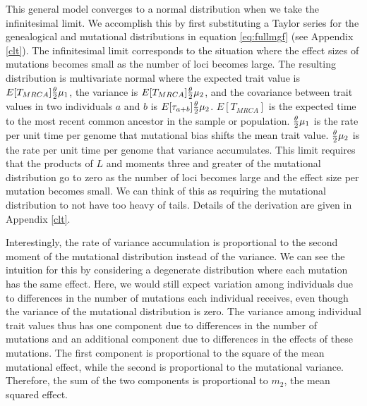 This general model converges to a normal distribution when we take the
infinitesimal limit. We accomplish this by first substituting a Taylor series
for the genealogical and mutational distributions in equation \eqref{eq:fullmgf}
(see Appendix \ref{clt}). The infinitesimal limit corresponds to the situation
where the effect sizes of mutations becomes small as the number of loci becomes
large. The resulting distribution is multivariate normal where the expected
trait value is $E[T_{MRCA}] \frac{\theta}{2} \mu_1$, the variance is $E[T_{MRCA}] \frac{\theta}{2} \mu_2$,
and the covariance between trait values in two individuals $a$ and $b$ is
$E[\tau_{a+b}] \frac{\theta}{2} \mu_2$. $E[T_{MRCA}]$ is the expected time to the most recent
common ancestor in the sample or population. $\frac{\theta}{2} \mu_1$ is the rate per unit
time per genome that mutational bias shifts the mean trait value. $\frac{\theta}{2} \mu_2$ is
the rate per unit time per genome that variance accumulates. This limit requires
that the products of $L$ and moments three and greater of the mutational
distribution go to zero as the number of loci becomes large and the effect size
per mutation becomes small. We can think of this as requiring the mutational
distribution to not have too heavy of tails. Details of the derivation are given
in Appendix \ref{clt}.

Interestingly, the rate of variance accumulation is proportional to the second
moment of the mutational distribution instead of the variance. We can see the
intuition for this by considering a degenerate distribution where each mutation
has the same effect. Here, we would still expect variation among individuals due
to differences in the number of mutations each individual receives, even though
the variance of the mutational distribution is zero. The variance among
individual trait values thus has one component due to differences in the number
of mutations and an additional component due to differences in the effects of
these mutations. The first component is proportional to the square of the mean
mutational effect, while the second is proportional to the mutational variance.
Therefore, the sum of the two components is proportional to $m_2$, the mean
squared effect.

